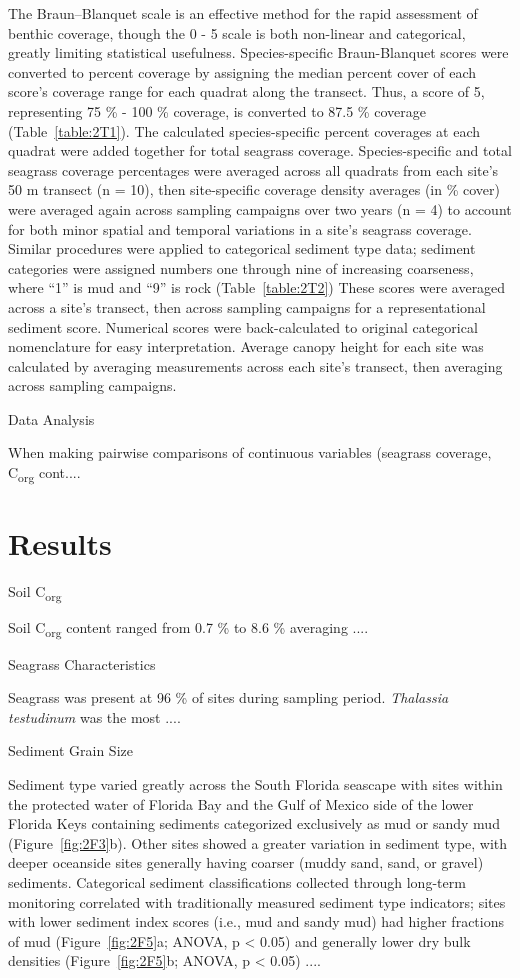 The Braun–Blanquet scale is an effective method for the rapid assessment of benthic coverage, though the 0 - 5 scale is both non-linear and categorical, greatly limiting statistical usefulness. Species-specific Braun-Blanquet scores were converted to percent coverage by assigning the median percent cover of each score’s coverage range for each quadrat along the transect. Thus, a score of 5, representing 75 \% - 100 \% coverage, is converted to 87.5 \% coverage (Table~\ref{table:2T1}). The calculated species-specific percent coverages at each quadrat were added together for total seagrass coverage. Species-specific and total seagrass coverage percentages were averaged across all quadrats from each site’s 50 m transect (n = 10), then site-specific coverage density averages (in \% cover) were averaged again across sampling campaigns over two years (n = 4) to account for both minor spatial and temporal variations in a site’s seagrass coverage. Similar procedures were applied to categorical sediment type data; sediment categories were assigned numbers one through nine of increasing coarseness, where “1” is mud and “9” is rock (Table~\ref{table:2T2}) These scores were averaged across a site’s transect, then across sampling campaigns for a representational sediment score. Numerical scores were back-calculated to original categorical nomenclature for easy interpretation. Average canopy height for each site was calculated by averaging measurements across each site’s transect, then averaging across sampling campaigns.

\bigskip
\noindent Data Analysis
\medskip

When making pairwise comparisons of continuous variables (seagrass coverage, C\textsubscript{org} cont....


\section{Results}


\bigskip
\noindent Soil C\textsubscript{org}
\medskip

Soil C\textsubscript{org} content ranged from 0.7 \% to 8.6 \% averaging ....

\bigskip
\noindent Seagrass Characteristics
\medskip

Seagrass was present at 96 \% of sites during sampling period. \textit{Thalassia testudinum} was the most ....

\bigskip
\noindent Sediment Grain Size
\medskip

Sediment type varied greatly across the South Florida seascape with sites within the protected water of Florida Bay and the Gulf of Mexico side of the lower Florida Keys containing sediments categorized exclusively as mud or sandy mud (Figure~\ref{fig:2F3}b). Other sites showed a greater variation in sediment type, with deeper oceanside sites generally having coarser (muddy sand, sand, or gravel) sediments. Categorical sediment classifications collected through long-term monitoring correlated with traditionally measured sediment type indicators; sites with lower sediment index scores (i.e., mud and sandy mud) had higher fractions of mud (Figure~\ref{fig:2F5}a; ANOVA, p < 0.05) and generally lower dry bulk densities (Figure~\ref{fig:2F5}b; ANOVA, p < 0.05) ....


